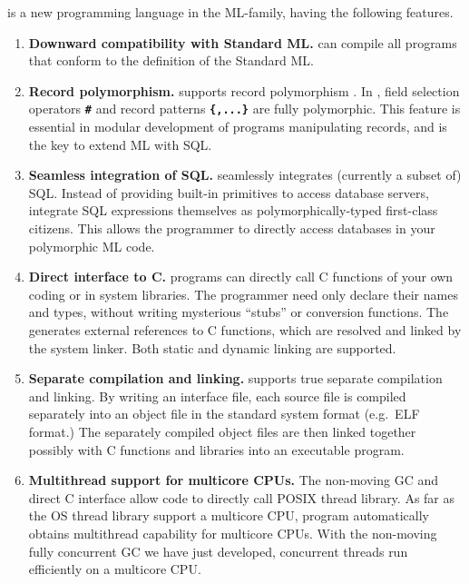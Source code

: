 \else%
	\smlsharp{} is a new programming language in the ML-family,
having the following features.
\begin{enumerate}
\item {\bf Downward compatibility with Standard ML.}
	\smlsharp{} can compile all programs that conform to the
definition of the Standard ML\cite{sml}.

\item {\bf Record polymorphism.}
	\smlsharp{} supports record polymorphism \cite{ohor95toplas}.
	In \smlsharp{} , field selection operators {\bf\tt \#}
and record patterns {\bf\tt \{,...\}} are fully
polymorphic.
	This feature is essential in modular development of programs
manipulating records, and is the key to extend ML with SQL.

\item {\bf Seamless integration of SQL.}
	\smlsharp{} seamlessly integrates (currently a subset of) SQL.
	Instead of providing built-in primitives to access
database servers, \smlsharp{} integrate SQL expressions themselves as
polymorphically-typed first-class citizens.
	This allows the programmer to directly access databases in
your polymorphic ML code.

\item {\bf Direct interface to C.}
	\smlsharp{} programs can directly call C functions of your own
coding or in system libraries.
	The programmer need only declare their names and types, without
writing mysterious ``stubs'' or conversion functions. 
	The \smlsharp{} generates external references to C functions,
which are resolved and linked by the system linker.
	Both static and dynamic linking are supported.

\item {\bf Separate compilation and linking.}
	\smlsharp{} supports true separate compilation and linking.
	By writing an interface file, each source file is compiled
separately into an object file in the standard system format (e.g.\ ELF
format.)
	The separately compiled object files are then linked together
possibly with C functions and libraries into an executable program.

\item {\bf Multithread support for multicore CPUs.}
	The non-moving GC \cite{ueno11icfp} and direct C interface allow
\smlsharp{} code to directly call POSIX thread library.
	As far as the OS thread library support a multicore CPU,
\smlsharp{} program automatically obtains multithread capability for
multicore CPUs.
	With the non-moving fully concurrent GC we have just developed, 
concurrent threads run efficiently on a multicore CPU.

\end{enumerate}

